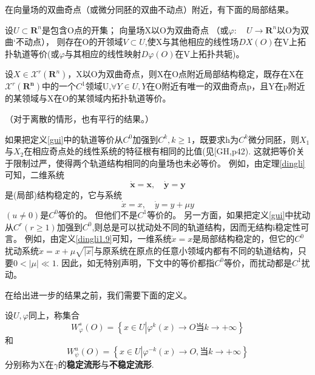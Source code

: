 在向量场的双曲奇点（或微分同胚的双曲不动点）附近，有下面的局部结果。
\begin{theorem}
  设$U \subset \mathbf { R } ^ { n }$是包含O点的开集；
  向量场X以O为双曲奇点
  （或$\varphi : \quad U \rightarrow \mathbf { R } ^ { n }$以O为双曲`不动点），
  则存在O的开领域\(V\subset U\),使X与其他相应的线性场\(DX(O)\)在V上拓扑轨道等价(或\(\varphi\)与其相应的线性映射\(D\varphi(O)\)在V上拓扑共轭)。
  \end{theorem}

  \begin{theorem}[局部结构稳定性定理]
    设$X \in \mathscr { X } ^ { r } \left( \mathbf { R } ^ { n } \right)$，X以O为双曲奇点，则X在O点附近局部结构稳定，既存在X在$\mathscr { X } ^ { r } \left( \mathbf { R } ^ { \boldsymbol { n } } \right)$中的一个\(C^1\)领域U,$\forall Y \in U , Y$在O附近有唯一的双曲奇点p，且Y在p附近的某领域与X在O的某领域内拓扑轨道等价。
 \end{theorem}


 （对于离散的情形，也有平行的结果。）
 
 \begin{corollary}

   如果把定义\ref{gui}中的轨道等价从\(C^0\)加强到$C ^ { k } , k \geqslant 1$，既要求h为\(C^k\)微分同胚，则\(X_1\)与\(X_2\)在相应奇点处的线性系统的特征根有相同的比值(见[GH,p42).
   这就把等价关于限制过严，使得两个轨道结构相同的向量场也未必等价。
   例如，由定理\ref{dingli}可知，二维系统
   \[\dot { \boldsymbol { x } } = \boldsymbol { x } , \quad \dot { \boldsymbol { y } } = \boldsymbol { y }\]
   是(局部)结构稳定的，它与系统
   \[\dot { x } = x , \quad \dot { y } = y + \mu y\]
   $( u \neq 0 )$是\(C^0\)等价的。
   但他们不是\(C^1\)等价的。
   另一方面，如果把定义\ref{gui}中扰动从$C ^ { r } ( r \geqslant 1 )$加强到\(C^0\),则总是可以扰动处不同的轨道结构，因而无结构i稳定性可言。
   例如，由定义\ref{dingli1.9}可知，一维系统\(\dot{x}=x\)是局部结构稳定的，但它的\(C^0\)扰动系统$\dot { x } = x + \mu \sqrt { | x | }$与原系统在原点的任意小领域内都有不同的轨道结构，只要\(0 <|\mu| \ll 1\).
   因此，如无特别声明，下文中的等价都指\(C^0\)等价，而扰动都是\(C^1\)扰动。
  \end{corollary}
  在给出进一步的结果之前，我们需要下面的定义。

  \begin{defination}
    设\(U,\varphi\)同上，称集合
    \[W _ { \varphi } ^ { s } ( O ) = \left\{ x \in U \left| \varphi ^ { k } ( x ) \rightarrow O\right.当 k \rightarrow +\infty \right\}\]
    和
    \[W _ { \psi } ^ { u } ( O ) = \left\{ x \in U \left| \varphi ^ { - k } ( x ) \rightarrow O\right. ,当k \rightarrow + \infty\right\}\]
分别称为X在\(\gamma\)的\textbf{稳定流形}与\textbf{不稳定流形}.
  \end{defination}

